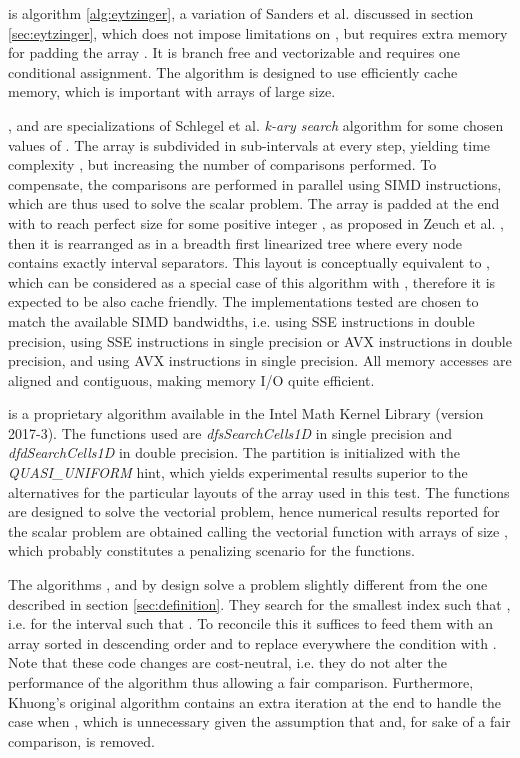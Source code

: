 \documentclass[preprint,1p,times]{elsarticle}
\begin{document}
\begin{myitemize}
		\item \textit{\EytzingerName} is algorithm \ref{alg:eytzinger}, a variation of Sanders et al. \cite{Sanders2004} discussed in section \ref{sec:eytzinger}, which does not impose limitations on , but requires extra memory for padding the array . It is branch free and vectorizable and requires one conditional assignment. The algorithm is designed to use efficiently cache memory, which is important with arrays  of large size.
		\item \textit{\TernaryName}, \textit{\PentaryName} and \textit{\NonaryName} are specializations of Schlegel et al. \cite{kary2009} \textit{k-ary search} algorithm for some chosen values of . The array  is subdivided in  sub-intervals at every step, yielding time complexity , but increasing the number of comparisons performed. To compensate, the comparisons are performed in parallel using SIMD instructions, which are thus used to solve the scalar problem. The array  is padded at the end with  to reach perfect size  for some positive integer , as proposed in Zeuch et al. \cite{kary2014}, then it is rearranged as in a breadth first linearized tree where every node contains exactly  interval separators. This layout is conceptually equivalent to \textit{\EytzingerName}, which can be considered as a special case of this algorithm with , therefore it is expected to be also cache friendly. The implementations tested are chosen to match the available SIMD bandwidths, i.e.  using SSE instructions in double precision,  using SSE instructions in single precision or AVX instructions in double precision, and  using AVX instructions in single precision. All memory accesses are aligned and contiguous, making memory I/O quite efficient.
	\item \textit{\MKLName} is a proprietary algorithm available in the Intel Math Kernel Library (version 2017-3). The functions used are \textit{dfsSearchCells1D} in single precision and \textit{dfdSearchCells1D} in double precision. The partition  is initialized with the \textit{QUASI\_UNIFORM} hint, which yields experimental results superior to the alternatives for the particular layouts of the array  used in this test. The functions are designed to solve the vectorial problem, hence numerical results reported for the scalar problem are obtained calling the vectorial function with arrays  of size , which probably constitutes a penalizing scenario for the functions.
\end{myitemize}

The algorithms \textit{\MorinBranchyName}, \textit{\LowerBoundName} and \textit{\MorinOffsetName} by design solve a problem slightly different from the one described in section \ref{sec:definition}. They search for the smallest index  such that , i.e. for the interval such that . To reconcile this it suffices to feed them with an array  sorted in descending order and to replace everywhere the condition  with . Note that these code changes are cost-neutral, i.e. they do not alter the performance of the algorithm thus allowing a fair comparison. Furthermore, Khuong's original algorithm contains an extra iteration at the end to handle the case when , which is unnecessary given the assumption that  and, for sake of a fair comparison, is removed.
\end{document}
